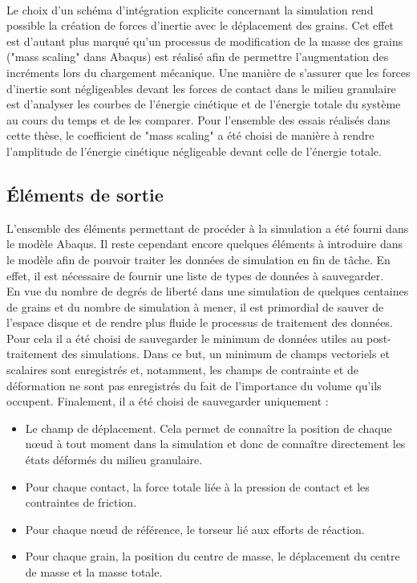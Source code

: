 		\\Le choix d'un schéma d'intégration explicite concernant la simulation rend possible la création de forces d'inertie avec le déplacement des grains. Cet effet est d'autant plus marqué qu'un processus de modification de la masse des grains ("mass scaling" dans Abaqus) est réalisé afin de permettre l'augmentation des incréments lors du chargement mécanique. Une manière de s'assurer que les forces d'inertie sont négligeables devant les forces de contact dans le milieu granulaire est d'analyser les courbes de l'énergie cinétique et de l'énergie totale du système au cours du temps et de les comparer. Pour l'ensemble des essais réalisés dans cette thèse, le coefficient de "mass scaling" a été choisi de manière à rendre l'amplitude de l'énergie cinétique négligeable devant celle de l'énergie totale.
	\subsection{\'Eléments de sortie}
		L'ensemble des éléments permettant de procéder à la simulation a été fourni dans le modèle Abaqus. Il reste cependant encore quelques éléments à introduire dans le modèle afin de pouvoir traiter les données de simulation en fin de tâche. En effet, il est nécessaire de fournir une liste de types de données à sauvegarder.
		\\En vue du nombre de degrés de liberté dans une simulation de quelques centaines de grains et du nombre de simulation à mener, il est primordial de sauver de l'espace disque et de rendre plus fluide le processus de traitement des données. Pour cela il a été choisi de sauvegarder le minimum de données utiles au post-traitement des simulations. Dans ce but, un minimum de champs vectoriels et scalaires sont enregistrés et, notamment, les champs de contrainte et de déformation ne sont pas enregistrés du fait de l'importance du volume qu'ils occupent. Finalement, il a été choisi de sauvegarder uniquement :
		\begin{itemize}
			\item Le champ de déplacement. Cela permet de connaître la position de chaque n\oe{}ud à tout moment dans la simulation et donc de connaître directement les états déformés du milieu granulaire.
			\item Pour chaque contact, la force totale liée à la pression de contact et les contraintes de friction.
			\item Pour chaque n\oe{}ud de référence, le torseur lié aux efforts de réaction.
			\item Pour chaque grain, la position du centre de masse, le déplacement du centre de masse et la masse totale.
		\end{itemize}
